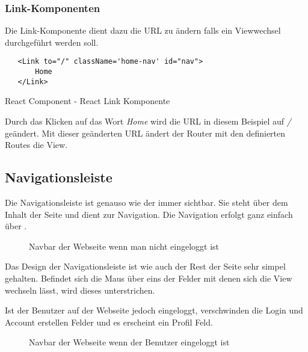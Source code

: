 \subsubsection{Link-Komponenten}
\label{React-Links}
Die Link-Komponente dient dazu die URL zu ändern falls ein Viewwechsel durchgeführt werden soll.
\begin{code}[htp]
\begin{lstlisting}
   <Link to="/" className='home-nav' id="nav">
       Home
   </Link>
\end{lstlisting}
\caption{React Component - React Link Komponente}
\end{code}
Durch das Klicken auf das Wort \textit{Home} wird die URL in diesem Beispiel auf \textit{/} geändert.
Mit dieser geänderten URL ändert der Router mit den definierten Routes die View.

\subsection{Navigationsleiste}
\label{nav}

Die Navigationsleiste ist genauso wie der  immer sichtbar. Sie steht über dem Inhalt der Seite und 
dient zur Navigation. Die Navigation erfolgt ganz einfach über .

\begin{figure}[H]
  \begin{center}
    \caption{Navbar der Webseite wenn man nicht eingeloggt ist}
  \end{center}
\end{figure}

Das Design der Navigationsleiste ist wie auch der Rest der Seite sehr simpel gehalten. Befindet sich
die Maus über eins der Felder mit denen sich die View wechseln lässt, wird dieses unterstrichen.


Ist der Benutzer auf der Webseite jedoch eingeloggt, verschwinden die Login und Account erstellen 
Felder und es erscheint ein Profil Feld.

\begin{figure}[H]
    \begin{center}
      \caption{Navbar der Webseite wenn der Benutzer eingeloggt ist}
    \end{center}
\end{figure}


